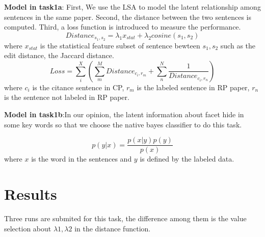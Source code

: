 \documentclass[11pt]{article}
\begin{document}
{\bf Model in task1a}: 
First, We use the LSA to model the latent relationship among sentences in the same paper.
Second, the distance between the two sentences is computed.
Third, a loss function is introduced to measure the performance.
$$
Distance_{s_1,s_2} = \lambda_1x_{stat} + \lambda_2cosine(s_1,s_2)
$$
where $x_{stat}$ is the statistical feature subset of sentence bewteen $s_1, s_2$ such as the edit distance, the Jaccard distance.
$$
Loss = \sum_i^X(\sum^M_mDistance_{c_i, r_m} +\sum^N_n\frac{1}{Distance_{c_i, r_n}})
$$
where $c_i$ is the citance sentence in CP, $r_m$ is the labeled sentence in RP paper, $r_n$ is the sentence not labeled in RP paper.

{\bf Model in task1b}:In our opinion, the latent information about facet hide in some key words so that we choose the native bayes classifier to do this task.

$$
p(y|x) = \frac{p(x|y)p(y)}{p(x)}
$$
where $x$ is the word in the sentences and $y$ is defined by the labeled data.

\section{Results}

Three runs are submited for this task, the difference among them is the value selection about $\lambda1, \lambda2$ in the distance function.
\end{document}
